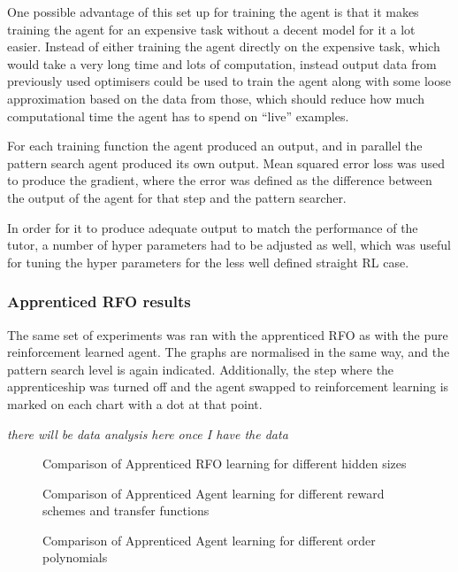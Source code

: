 One possible advantage of this set up for training the agent is that it makes training the agent for an expensive task without a decent model for it a lot easier. Instead of either training the agent directly on the expensive task, which would take a very long time and lots of computation, instead output data from previously used optimisers could be used to train the agent along with some loose approximation based on the data from those, which should reduce how much computational time the agent has to spend on ``live'' examples.

For each training function the agent produced an output, and in parallel the pattern search agent produced its own output. Mean squared error loss was used to produce the gradient, where the error was defined as the difference between the output of the agent for that step and the pattern searcher.

In order for it to produce adequate output to match the performance of the tutor, a number of hyper parameters had to be adjusted as well, which was useful for tuning the hyper parameters for the less well defined straight RL case.

\subsubsection{Apprenticed RFO results}
The same set of experiments was ran with the apprenticed RFO as with the pure reinforcement learned agent. %
The graphs are normalised in the same way, and the pattern search level is again indicated. Additionally, the step where the apprenticeship was turned off and the agent swapped to reinforcement learning is marked on each chart with a dot at that point.

\emph{there will be data analysis here once I have the data}
\begin{figure}
\centering

\caption{Comparison of Apprenticed RFO learning for different hidden sizes}
\label{fig:exp1apprfo}
\end{figure}

\begin{figure}
\centering

\caption{Comparison of Apprenticed Agent learning for different reward schemes and transfer functions}
\label{fig:exp3app}
\end{figure}

\begin{figure}
\centering

\caption{Comparison of Apprenticed Agent learning for different order polynomials}
\label{fig:exp2parapp}
\end{figure}

